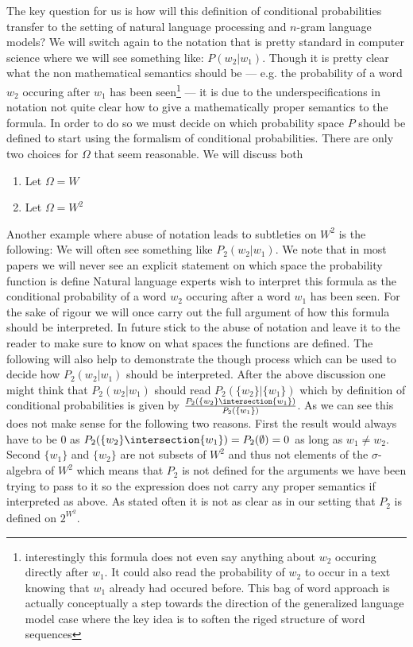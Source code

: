 The key question for us is how will this definition of conditional probabilities transfer to the setting of natural language processing and $n$-gram language models?
We will switch again to the notation that is pretty standard in computer science  where we will see something like: $P(w_2|w_1)$.
Though it is pretty clear what the non mathematical semantics should be --- e.g. the probability of a word $w_2$ occuring after $w_1$ has been seen\footnote{interestingly this formula does not even say anything about $w_2$ occuring directly after $w_1$. It could also read the probability of $w_2$ to occur in a text knowing that $w_1$ already had occured before. This bag of word approach is actually conceptually a step towards the direction of the generalized language model case where the key idea is to soften the riged structure of word sequences} --- it is due to the underspecifications in notation not quite clear how to give a mathematically proper semantics to the formula.
In order to do so we must decide on which probability space $P$ should be defined to start using the formalism of conditional probabilities.
There are only two choices for $\Omega$ that seem reasonable. We will discuss both
\begin{enumerate}
\item Let $\Omega=W$ 
\item Let $\Omega=W^2$
\end{enumerate}


Another example where abuse of notation leads to subtleties on $W^2$ is the following: 
We will often see something like $P_2(w_2|w_1)$. We note that in most papers we will never see an explicit statement on which space the probability function is define
Natural language experts wish to interpret this formula as the conditional probability of a word $w_2$ occuring after a word $w_1$ has been seen.
For the sake of rigour we will once carry out the full argument of how this formula should be interpreted.
In future stick to the abuse of notation and leave it to the reader to make sure to know on what spaces the functions are defined. 
The following will also help to demonstrate the though process which can be used to decide how $P_2(w_2|w_1)$ should be interpreted.
After the above discussion one might think that $P_2(w_2|w_1)$ should read $P_2(\{w_2\}|\{w_1\})$ which by definition of conditional probabilities is given by $\frac{P_2(\{w_2\}\intersection \{w_1\})}{P_2(\{w_1\})}$.
As we can see this does not make sense for the following two reasons.
First the result would always have to be $0$ as $P_2(\{w_2\}\intersection \{w_1\}) = P_2(\emptyset) = 0$ as long as $w_1\neq w_2$.
Second $\{w_1\}$ and $\{w_2\}$ are not subsets of $W^2$ and thus not elements of the $\sigma$-algebra of $W^2$ which means that $P_2$ is not defined for the arguments we have been trying to pass to it so the expression does not carry any proper semantics if interpreted as above. 
As stated often it is not as clear as in our setting that $P_2$ is defined on $2^{W^2}$.

